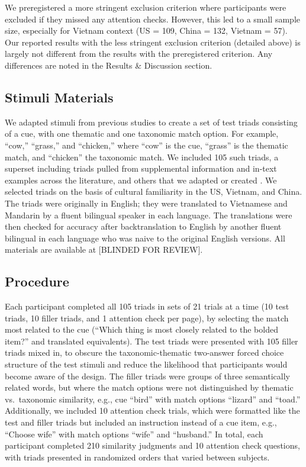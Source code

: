 \documentclass[10pt, letterpaper]{article}
\begin{document}
We preregistered a more stringent exclusion criterion where participants
were excluded if they missed any attention checks. However, this led to
a small sample size, especially for Vietnam context (US = 109, China =
132, Vietnam = 57). Our reported results with the less stringent
exclusion criterion (detailed above) is largely not different from the
results with the preregistered criterion. Any differences are noted in
the Results \& Discussion section.

\hypertarget{stimuli-materials}{%
\subsection{Stimuli Materials}\label{stimuli-materials}}

We adapted stimuli from previous studies to create a set of test triads
consisting of a cue, with one thematic and one taxonomic match option.
For example, ``cow,'' ``grass,'' and ``chicken,'' where ``cow'' is the
cue, ``grass'' is the thematic match, and ``chicken'' the taxonomic
match. We included 105 such triads, a superset including triads pulled
from supplemental information and in-text examples across the
literature, and others that we adapted or created . We selected triads
on the basis of cultural familiarity in the US, Vietnam, and China. The
triads were originally in English; they were translated to Vietnamese
and Mandarin by a fluent bilingual speaker in each language. The
translations were then checked for accuracy after backtranslation to
English by another fluent bilingual in each language who was naive to
the original English versions. All materials are available at {[}BLINDED
FOR REVIEW{]}.

\hypertarget{procedure}{%
\subsection{Procedure}\label{procedure}}

Each participant completed all 105 triads in sets of 21 trials at a time
(10 test triads, 10 filler triads, and 1 attention check per page), by
selecting the match most related to the cue (``Which thing is most
closely related to the bolded item?'' and translated equivalents). The
test triads were presented with 105 filler triads mixed in, to obscure
the taxonomic-thematic two-answer forced choice structure of the test
stimuli and reduce the likelihood that participants would become aware
of the design. The filler triads were groups of three semantically
related words, but where the match options were not distinguished by
thematic vs.~taxonomic similarity, e.g., cue ``bird'' with match options
``lizard'' and ``toad.'' Additionally, we included 10 attention check
trials, which were formatted like the test and filler triads but
included an instruction instead of a cue item, e.g., ``Choose wife''
with match options ``wife'' and ``husband.'' In total, each participant
completed 210 similarity judgments and 10 attention check questions,
with triads presented in randomized orders that varied between subjects.
\end{document}
